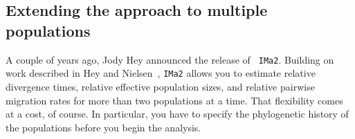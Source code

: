 \documentclass[12pt]{article}
\begin{document}
\subsection*{Extending the approach to multiple populations}

A couple of years ago, Jody Hey announced the release of {\tt
  IMa2}. Building on work described in Hey and
Nielsen~\cite{Hey-Nielsen-2004,Hey-Nielsen-2007}, {\tt IMa2} allows
you to estimate relative divergence times, relative effective
population sizes, and relative pairwise migration rates for more than
two populations at a time. That flexibility comes at a cost, of
course. In particular, you have to specify the phylogenetic history of
the populations before you begin the analysis.




\ccLicense
\end{document}
